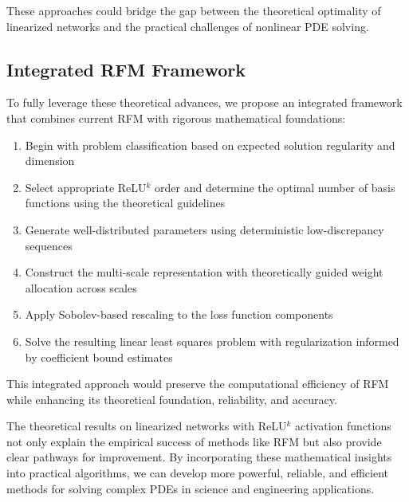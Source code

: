 \documentclass[11pt]{article}
\begin{document}
These approaches could bridge the gap between the theoretical optimality of linearized networks and the practical challenges of nonlinear PDE solving.

\subsection{Integrated RFM Framework}

To fully leverage these theoretical advances, we propose an integrated framework that combines current RFM with rigorous mathematical foundations:

\begin{enumerate}
    \item Begin with problem classification based on expected solution regularity and dimension
    
    \item Select appropriate ReLU$^k$ order and determine the optimal number of basis functions using the theoretical guidelines
    
    \item Generate well-distributed parameters using deterministic low-discrepancy sequences
    
    \item Construct the multi-scale representation with theoretically guided weight allocation across scales
    
    \item Apply Sobolev-based rescaling to the loss function components
    
    \item Solve the resulting linear least squares problem with regularization informed by coefficient bound estimates
\end{enumerate}

This integrated approach would preserve the computational efficiency of RFM while enhancing its theoretical foundation, reliability, and accuracy.

The theoretical results on linearized networks with ReLU$^k$ activation functions not only explain the empirical success of methods like RFM but also provide clear pathways for improvement. By incorporating these mathematical insights into practical algorithms, we can develop more powerful, reliable, and efficient methods for solving complex PDEs in science and engineering applications.
\end{document}
